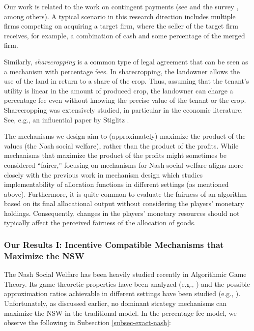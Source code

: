 \documentclass{theoretics}
\begin{document}
Our work is related to the work on contingent payments (see \cite{Hansen85, DM2014} and the survey \cite{S2013}, among others). A typical scenario in this research direction includes multiple firms competing on acquiring a target firm, where the seller of the target firm receives, for example, a combination of cash and some percentage of the merged firm.

Similarly, \emph{sharecropping} is a common type of legal agreement that can be seen as a mechanism with percentage fees. In sharecropping, the landowner allows the use of the land in return to a share of the crop. Thus, assuming that the tenant's utility is linear in the amount of produced crop, the landowner can charge a percentage fee even without knowing the precise value of the tenant or the crop. Sharecropping was extensively studied, in particular in the economic literature. See, e.g., an influential paper by Stiglitz \cite{stiglitz74}.

The mechanisms we design aim to (approximately) maximize the product of the values (the Nash social welfare), rather than the product of the profits. While mechanisms that maximize the product of the profits might sometimes be considered ``fairer,'' focusing on mechanisms for Nash social welfare aligns more closely with the previous work in mechanism design which studies implementability of allocation functions in different settings (as mentioned above). Furthermore, it is quite common to evaluate the fairness of an algorithm based on its final allocational output without considering the players' monetary holdings. Consequently, changes in the players' monetary resources should not typically affect the perceived fairness of the allocation of goods.



\subsubsection*{Our Results I: Incentive Compatible Mechanisms that Maximize the NSW}

The Nash Social Welfare has been heavily studied recently in Algorithmic Game Theory. Its game theoretic properties have been analyzed (e.g., \cite{CKMPSW19}) and the possible approximation ratios achievable in different settings have been studied (e.g., \cite{CV15,AOSS17,BKKV18,LV22}). Unfortunately, as discussed earlier, no dominant strategy mechanisms can maximize the NSW in the traditional model. In the percentage fee model, we observe the following in Subsection \ref{subsec-exact-nash}:
\end{document}
